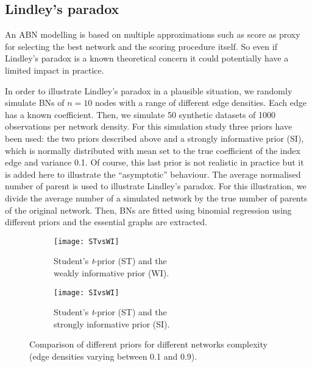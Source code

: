 \documentclass{svproc}
\begin{document}
\subsection{Lindley's paradox}
An ABN modelling is based on multiple approximations such as score as proxy for selecting the best network and the scoring procedure itself. So even if Lindley's paradox is a known theoretical concern it could potentially have a limited impact in practice. 

In order to illustrate Lindley's paradox in a plausible situation, we randomly simulate BNs of $n=10$ nodes with a range of different edge densities. Each edge has a known coefficient. Then, we simulate 50 synthetic datasets of 1000 observations per network density. For this simulation study three priors have been used: the two priors described above and a strongly informative prior (SI), which is normally distributed with mean set to the true coefficient of the index edge and variance 0.1. Of course, this last prior is not realistic in practice but it is added here to illustrate the ``asymptotic'' behaviour. The average normalised number of parent is used to illustrate Lindley's paradox. For this illustration, we divide the average number of a simulated network by the true number of parents of the original network. Then, BNs are fitted using binomial regression using different priors and the essential graphs are extracted.


\begin{figure}
\begin{subfigure}{.49\textwidth}
  \hspace*{-1mm}\texttt{[image: STvsWI]}
  \caption{Student's \emph{t}-prior (ST) and the\\ weakly informative prior (WI).}
  \label{fig:sfig1}
\end{subfigure}%
\begin{subfigure}{.49\textwidth}
  \hspace*{-1mm}\texttt{[image: SIvsWI]}
  \caption{Student's \emph{t}-prior (ST) and the\\ strongly informative prior (SI).}
  \label{fig:sfig2}
\end{subfigure}
\caption{Comparison of different priors for different networks complexity (edge densities varying between 0.1 and 0.9).}
\label{fig}
\end{figure}
\end{document}
